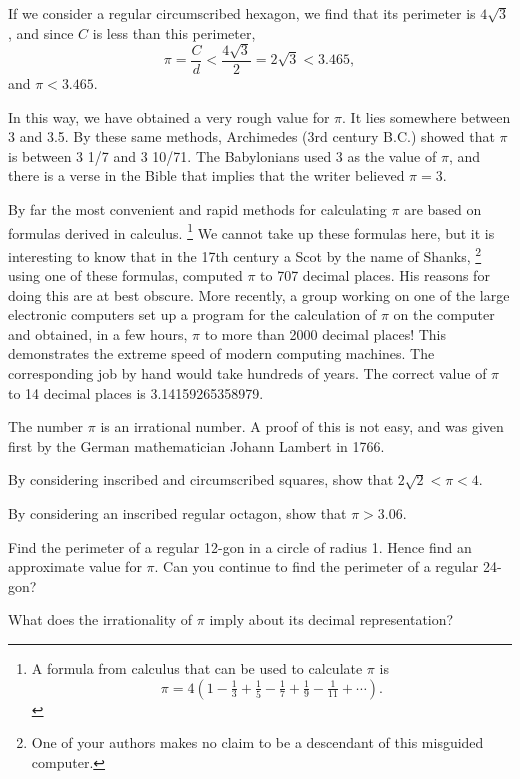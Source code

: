\documentclass[11pt]{book}
\theoremstyle{XIplainnote}
\theoremstyle{bkplain}
\newcommand{\XIsymfoot}[1]{%
  \begingroup\renewcommand{\thefootnote}{\fnsymbol{footnote}}%
  \footnote{#1}\endgroup}
\begin{document}
If we consider a regular circumscribed hexagon, we find that its perimeter is
$4\sqrt{3}$, and since $C$ is less than this perimeter,
\[
\pi = \frac{C}{d} < \frac{4\sqrt{3}}{2} = 2\sqrt{3} < 3.465,
\]
and $\pi < 3.465$.

In this way, we have obtained a very rough value for $\pi$. It lies somewhere
between 3 and 3.5. By these same methods, Archimedes (3rd century B.C.) showed
that $\pi$ is between 3 1/7 and 3 10/71. The Babylonians used 3 as the value of
$\pi$, and there is a verse in the Bible that implies that the writer believed
$\pi = 3$.

By far the most convenient and rapid methods for calculating $\pi$ are based on
formulas derived in calculus.\XIsymfoot{A formula from calculus that can be
used to calculate $\pi$ is
\[
\pi = 4\left(1 - \tfrac{1}{3} + \tfrac{1}{5} - \tfrac{1}{7} + \tfrac{1}{9}
- \tfrac{1}{11} + \cdots\right).
\]}
We cannot take up these formulas here, but it is interesting to know that in
the 17th century a Scot by the name of Shanks,\XIsymfoot{One of your authors
makes no claim to be a descendant of this misguided computer.} using one of
these formulas, computed $\pi$ to 707 decimal places. His reasons for doing
this are at best obscure. More recently, a group working on one of the large
electronic computers set up a program for the calculation of $\pi$ on the
computer and obtained, in a few hours, $\pi$ to more than 2000 decimal places!
This demonstrates the extreme speed of modern computing machines. The
corresponding job by hand would take hundreds of years. The correct value of
$\pi$ to 14 decimal places is 3.14159265358979.

The number $\pi$ is an irrational number. A proof of this is not easy, and was
given first by the German mathematician Johann Lambert in 1766.

\begin{exercisecols}
\begin{exlist}
\item By considering inscribed and circumscribed squares, show that
      $2\sqrt{2} < \pi < 4$.
\item[\stex 2.] By considering an inscribed regular octagon, show that
      $\pi > 3.06$.
\item[\stex 3.] Find the perimeter of a regular 12-gon in a circle of radius 1.
      Hence find an approximate value for $\pi$. Can you continue to find the
      perimeter of a regular 24-gon?
\item[4.] What does the irrationality of $\pi$ imply about its decimal
      representation?
\end{exlist}
\end{exercisecols}
\end{document}
